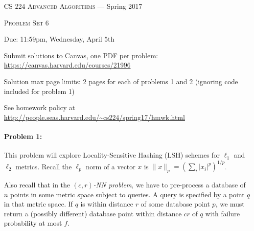 \documentclass[12pt]{article}
\begin{document}
\thispagestyle{empty}

\begin{center}
{\Large \textsc{CS 224 Advanced Algorithms} --- Spring 2017}

\bigskip

{\Large \textsc{Problem Set 6}}

\smallskip

Due: 11:59pm, Wednesday, April 5th

\medskip

Submit solutions to Canvas, one PDF per problem: \url{https://canvas.harvard.edu/courses/21996}

\medskip

Solution max page limits: 2 pages for each of problems 1 and 2 (ignoring code included for problem 1)

\bigskip

{\footnotesize See homework policy at \url{http://people.seas.harvard.edu/~cs224/spring17/hmwk.html}}
\end{center}

\paragraph{Problem 1:} This problem will explore Locality-Sensitive Hashing (LSH) schemes for $\ell_1$ and $\ell_2$ metrics. Recall the $\ell_p$ norm of a vector $x$ is $\|x\|_p = (\sum_i |x_i|^p)^{1/p}$.

Also recall that in the {\em $(c,r)$-NN problem}, we have to pre-process a database of $n$ points in some metric space subject to queries. A query is specified by a point $q$ in that metric space. If $q$ is within distance $r$ of some database point $p$, we must return a (possibly different) database point within distance $cr$ of $q$ with failure probability at most $f$.
\end{document}
